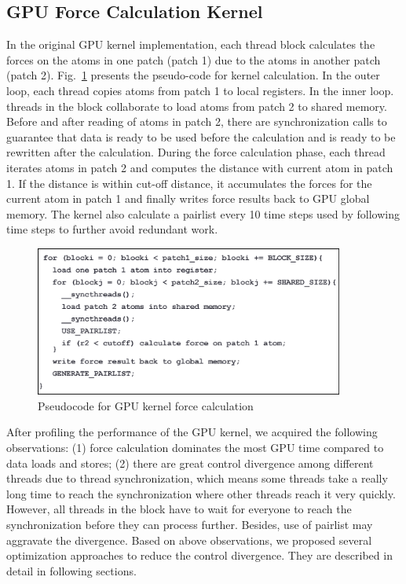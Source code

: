 \subsection{GPU Force Calculation Kernel}

In the original GPU kernel implementation, each thread block calculates the forces on the atoms in one patch (patch 1)
due to the atoms in another patch (patch 2). Fig.~\ref{figs:pseudocode} presents the pseudo-code for kernel calculation.
In the outer loop, each thread copies atoms from patch 1 to local registers. In the inner loop. threads in the block collaborate to
load atoms from patch 2 to shared memory. Before and after reading of atoms in patch 2, there are synchronization calls to guarantee
that data is ready to be used before the calculation and is ready to be rewritten after the calculation. During the force
calculation phase, each thread iterates atoms in patch 2 and computes the distance with current atom in patch 1.
If the distance is within cut-off distance, it accumulates the forces for the current atom in patch 1 and finally writes force results
back to GPU global memory. The kernel also calculate a pairlist every 10 time steps used by following time steps to further avoid redundant work. 

\begin{figure}[h]
\centering
\setlength{\abovecaptionskip}{-1pt}
\setlength{\belowcaptionskip}{-2pt}
\includegraphics[width=4.0in]{figs/pseudocode.eps}
\caption{Pseudocode for GPU kernel force calculation}
\label{figs:pseudocode}
\end{figure}

After profiling the performance of the GPU kernel, we acquired the following observations:
(1) force calculation dominates the most GPU time compared to data loads and stores;
(2) there are great control divergence among different threads due to thread synchronization, which means some threads take a really long time
to reach the synchronization where other threads reach it very quickly. However, all threads in the block have to wait for everyone to
reach the synchronization before they can process further. Besides, use of pairlist may aggravate the divergence.
Based on above observations, we proposed several optimization approaches to reduce the control
divergence. They are described in detail in following sections.

